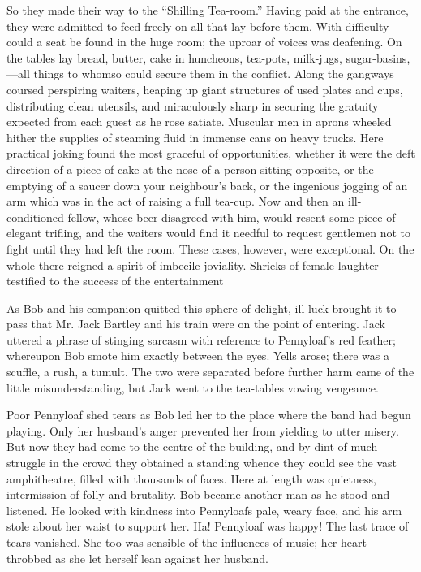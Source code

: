 So they made their way to the ``Shilling Tea-room.'' Having paid at the
entrance, they were admitted to feed freely on all that lay before them.
With difficulty could a seat be found in the huge room; the uproar of
voices was deafening. On the tables lay bread, butter, cake in
huncheons, tea-pots, milk-jugs, sugar-basins,---all things to whomso
could secure them in the conflict. Along the gangways coursed perspiring
waiters, heaping up giant structures of used plates and cups,
distributing clean utensils, and miraculously sharp in securing the
gratuity expected from each guest as he rose satiate. Muscular men in
aprons wheeled hither the supplies of steaming fluid in immense cans on
heavy trucks. Here practical joking found the most graceful of
opportunities, whether it were the deft direction of a piece of cake at
the nose of a person sitting opposite, or the emptying of a saucer down
your neighbour's back, or the ingenious {}jogging of an arm which was in
the act of raising a full tea-cup. Now and then an ill-conditioned
fellow, whose beer disagreed with him, would resent some piece of
elegant trifling, and the waiters would find it needful to request
gentlemen not to fight until they had left the room. These cases,
however, were exceptional. On the whole there reigned a spirit of
imbecile joviality. Shrieks of female laughter testified to the success
of the entertainment

As Bob and his companion quitted this sphere of delight, ill-luck
brought it to pass that Mr. Jack Bartley and his train were on the point
of entering. Jack uttered a phrase of stinging sarcasm with reference to
Pennyloaf's red feather; whereupon Bob smote him exactly between the
eyes. Yells arose; there was a scuffle, a rush, a tumult. The two were
separated before further harm came of the little misunderstanding, but
Jack went to the tea-tables vowing vengeance.

Poor Pennyloaf shed tears as Bob led her to the place where the band had
begun {}playing. Only her husband's anger prevented her from yielding to
utter misery. But now they had come to the centre of the building, and
by dint of much struggle in the crowd they obtained a standing whence
they could see the vast amphitheatre, filled with thousands of faces.
Here at length was quietness, intermission of folly and brutality. Bob
became another man as he stood and listened. He looked with kindness
into Pennyloafs pale, weary face, and his arm stole about her waist to
support her. Ha! Pennyloaf was happy! The last trace of tears vanished.
She too was sensible of the influences of music; her heart throbbed as
she let herself lean against her husband.

